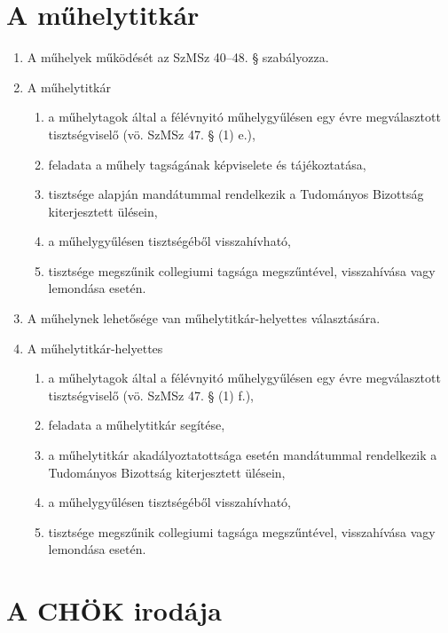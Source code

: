 \documentclass{../styles/rulebook}
\begin{document}
\section{A műhelytitkár}

\begin{enumerate}
	\item A műhelyek működését az SzMSz 40–48. § szabályozza.
	\item A műhelytitkár
	\begin{enumerate}
		\item a műhelytagok által a félévnyitó műhelygyűlésen egy évre megválasztott tisztségviselő (vö. SzMSz 47. § (1) e.),
		\item feladata a műhely tagságának képviselete és tájékoztatása,
		\item tisztsége alapján mandátummal rendelkezik a Tudományos Bizottság kiterjesztett ülésein,
		\item a műhelygyűlésen tisztségéből visszahívható,
		\item tisztsége megszűnik collegiumi tagsága megszűntével, visszahívása vagy lemondása esetén.
	\end{enumerate}
	\item A műhelynek lehetősége van műhelytitkár-helyettes választására.
	\item A műhelytitkár-helyettes
	\begin{enumerate}
		\item a műhelytagok által a félévnyitó műhelygyűlésen egy évre megválasztott tisztségviselő (vö. SzMSz 47. § (1) f.),
		\item feladata a műhelytitkár segítése,
		\item a műhelytitkár akadályoztatottsága esetén mandátummal rendelkezik a Tudományos Bizottság kiterjesztett ülésein,
		\item a műhelygyűlésen tisztségéből visszahívható,
		\item tisztsége megszűnik collegiumi tagsága megszűntével, visszahívása vagy lemondása esetén.
	\end{enumerate}
\end{enumerate}


\section{A CHÖK irodája}
\end{document}
